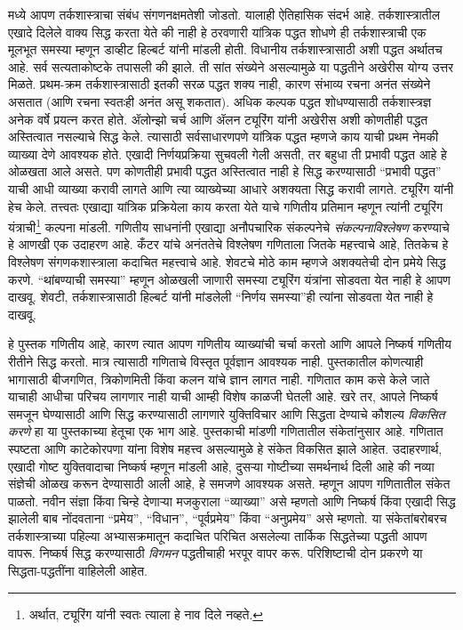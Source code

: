  मध्ये आपण तर्कशास्त्राचा संबंध संगणनक्षमतेशी जोडतो. यालाही ऐतिहासिक संदर्भ आहे. तर्कशास्त्रातील एखादे दिलेले वाक्य सिद्ध करता येते की नाही हे ठरवणारी यांत्रिक पद्धत शोधणे ही तर्कशास्त्राची एक मूलभूत समस्या म्हणून डाव्हीट हिल्बर्ट यांनी मांडली होती. विधानीय तर्कशास्त्रासाठी अशी पद्धत अर्थातच आहे. सर्व सत्यताकोष्टके तपासली की झाले. ती सांत संख्येने असल्यामुळे या पद्धतीने अखेरीस योग्य उत्तर मिळते. प्रथम-क्रम तर्कशास्त्रासाठी इतकी सरळ पद्धत शक्य नाही, कारण संभाव्य रचना अनंत संख्येने असतात (आणि रचना स्वतःही अनंत असू शकतात). अधिक कल्पक पद्धत शोधण्यासाठी तर्कशास्त्रज्ञ अनेक वर्षे प्रयत्न करत होते. ॲलोन्झो चर्च आणि ॲलन ट्यूरिंग यांनी अखेरीस अशी कोणतीही पद्धत अस्तित्वात नसल्याचे सिद्ध केले. त्यासाठी सर्वसाधारणपणे यांत्रिक पद्धत म्हणजे काय याची प्रथम नेमकी व्याख्या देणे आवश्यक होते. एखादी निर्णयप्रक्रिया सुचवली गेली असती, तर बहुधा ती प्रभावी पद्धत आहे हे ओळखता आले असते. पण कोणतीही प्रभावी पद्धत अस्तित्वात नाही हे सिद्ध करण्यासाठी ``प्रभावी पद्धत'' याची आधी व्याख्या करावी लागते आणि त्या व्याख्येच्या आधारे अशक्यता सिद्ध करावी लागते. ट्यूरिंग यांनी हेच केले. तत्त्वतः एखाद्या यांत्रिक प्रक्रियेला काय करता येते याचे गणितीय प्रतिमान म्हणून त्यांनी ट्यूरिंग यंत्राची\footnote{अर्थात, ट्यूरिंग यांनी स्वतः त्याला हे नाव दिले नव्हते.} कल्पना मांडली. गणितीय साधनांनी एखाद्या अनौपचारिक संकल्पनेचे \emph{संकल्पनाविश्लेषण} करण्याचे हे आणखी एक उदाहरण आहे. कँटर यांचे अनंततेचे विश्लेषण गणिताला जितके महत्त्वाचे आहे, तितकेच हे विश्लेषण संगणकशास्त्राला कदाचित महत्त्वाचे आहे. शेवटचे मोठे काम म्हणजे अशक्यतेची दोन प्रमेये सिद्ध करणे. ``थांबण्याची समस्या'' म्हणून ओळखली जाणारी समस्या ट्यूरिंग यंत्रांना सोडवता येत नाही हे आपण दाखवू. शेवटी, तर्कशास्त्रासाठी हिल्बर्ट यांनी मांडलेली ``निर्णय समस्या''ही त्यांना सोडवता येत नाही हे दाखवू.

हे पुस्तक गणितीय आहे, कारण त्यात आपण गणितीय व्याख्यांची चर्चा करतो आणि आपले निष्कर्ष गणितीय रीतीने सिद्ध करतो. मात्र त्यासाठी गणिताचे विस्तृत पूर्वज्ञान आवश्यक नाही. पुस्तकातील कोणत्याही भागासाठी बीजगणित, त्रिकोणमिती किंवा कलन यांचे ज्ञान लागत नाही. गणितात काम कसे केले जाते याचाही आधीचा परिचय लागणार नाही याची आम्ही विशेष काळजी घेतली आहे. खरे तर, आपले निष्कर्ष समजून घेण्यासाठी आणि सिद्ध करण्यासाठी लागणारे युक्तिविचार आणि सिद्धता देण्याचे कौशल्य \emph{विकसित करणे} हा या पुस्तकाच्या हेतूचा एक भाग आहे. पुस्तकाची मांडणी गणितातील संकेतांनुसार आहे. गणितात स्पष्टता आणि काटेकोरपणा यांना विशेष महत्त्व असल्यामुळे हे संकेत विकसित झाले आहेत. उदाहरणार्थ, एखादी गोष्ट युक्तिवादाचा निष्कर्ष म्हणून मांडली आहे, दुसऱ्या गोष्टीच्या समर्थनार्थ दिली आहे की नव्या संज्ञेची ओळख करून देण्यासाठी आली आहे, हे समजणे आवश्यक असते. म्हणून आपण गणितातील संकेत पाळतो. नवीन संज्ञा किंवा चिन्हे देणाऱ्या मजकुराला ``व्याख्या'' असे म्हणतो आणि निष्कर्ष किंवा एखादी सिद्ध झालेली बाब नोंदवताना ``प्रमेय'', ``विधान'', ``पूर्वप्रमेय'' किंवा ``अनुप्रमेय'' असे म्हणतो. या संकेतांबरोबरच तर्कशास्त्राच्या पहिल्या अभ्यासक्रमातून कदाचित परिचित असलेल्या तार्किक सिद्धतेच्या पद्धती आपण वापरू. निष्कर्ष सिद्ध करण्यासाठी \emph{विगमन} पद्धतीचाही भरपूर वापर करू. परिशिष्टाची दोन प्रकरणे या सिद्धता-पद्धतींना वाहिलेली आहेत.

